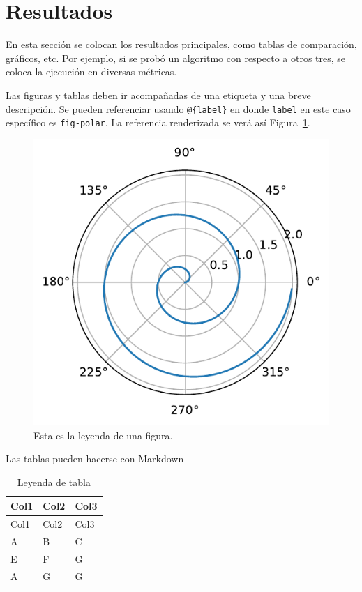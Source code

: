 \documentclass[
  letterpaper,
  DIV=11,
  numbers=noendperiod]{scrartcl}
\begin{document}
\hypertarget{resultados}{%
\section{Resultados}\label{resultados}}

En esta sección se colocan los resultados principales, como tablas de
comparación, gráficos, etc. Por ejemplo, si se probó un algoritmo con
respecto a otros tres, se coloca la ejecución en diversas métricas.

Las figuras y tablas deben ir acompañadas de una etiqueta y una breve
descripción. Se pueden referenciar usando \texttt{@\{label\}} en donde
\texttt{label} en este caso específico es \texttt{fig-polar}. La
referencia renderizada se verá así Figura~\ref{fig-polar}.

\begin{figure}[h]

{\centering \includegraphics{template_reporte_files/figure-pdf/fig-polar-output-1.pdf}

}

\caption{\label{fig-polar}Esta es la leyenda de una figura.}

\end{figure}

Las tablas pueden hacerse con Markdown

\hypertarget{tbl-letters}{}
\begin{longtable}[]{@{}lll@{}}
\caption{\label{tbl-letters}Leyenda de tabla}\tabularnewline
\toprule()
Col1 & Col2 & Col3 \\
\midrule()
\endfirsthead
\toprule()
Col1 & Col2 & Col3 \\
\midrule()
\endhead
A & B & C \\
E & F & G \\
A & G & G \\
\bottomrule()
\end{longtable}
\end{document}
